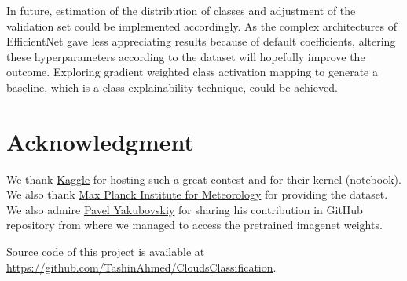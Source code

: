 \documentclass[conference]{IEEEtran}
\begin{document}
In future, estimation of the distribution of classes and adjustment of the validation set could be implemented accordingly. As the complex architectures of EfficientNet gave less appreciating results because of default coefficients, altering these hyperparameters according to the dataset will hopefully improve the outcome. Exploring gradient weighted class activation mapping to generate a baseline, which is a class explainability technique, could be achieved.

\section*{Acknowledgment}
We thank \href{https://www.kaggle.com/}{Kaggle} for hosting such a great contest and for their kernel (notebook). We also thank \href{https://www.mpimet.mpg.de/en/mpimet-homepage/}{Max Planck Institute for Meteorology} for providing the dataset. We also admire \href{https://github.com/qubvel}{Pavel Yakubovskiy} for sharing his contribution in GitHub repository from where we managed to access the pretrained imagenet weights.

Source code of this project is available at \color{blue} \url{https://github.com/TashinAhmed/CloudsClassification}\color{black}.


 

\end{document}
